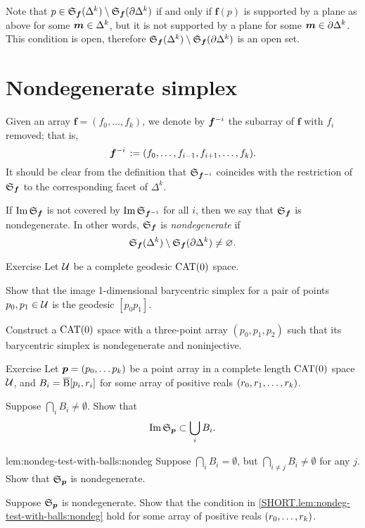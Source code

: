 Note that $p\in \mathfrak{S}_{\bm{f}}(\Delta^k)\setminus\mathfrak{S}_{\bm{f}}(\partial\Delta^k)$ if and only if 
$\bm{f}(p)$ is supported by a plane as above for some $\bm{m}\in\Delta^{k}$,
but it is not supported by a plane for some $\bm{m}\in\partial\Delta^{k}$.
This condition is open, therefore $\mathfrak{S}_{\bm{f}}(\Delta^k)\setminus\mathfrak{S}_{\bm{f}}(\partial\Delta^k)$ is an open set.
\qeds

\section{Nondegenerate simplex}

Given an array $\bm{f}=(f_0,\dots,f_k)$,
we denote by $\bm{f}^{{-} i}$ the subarray of $\bm{f}$ with $f_i$ removed;
that is, 
\[\bm{f}^{{-} i\,}
\mathrel{:=}
(f_0,\dots,f_{i-1},f_{i+1},\dots,f_k).\]
It should be clear from the definition that $\mathfrak{S}_{\bm{f}^{{-} i}}$ 
coincides with the restriction of $\mathfrak{S}_{\bm{f}}$ to the corresponding facet of $\Delta^k$.

If $\operatorname{\rm Im}\nolimits \mathfrak{S}_{\bm{f}}$ is not covered by $\operatorname{\rm Im}\nolimits \mathfrak{S}_{\bm{f}^{{-} i}}$ for all $i$,
then we say that $\mathfrak{S}_{\bm{f}}$ is nondegenerate.
In other words, $\mathfrak{S}_{\bm{f}}$ is \emph{nondegenerate} if 
\[\mathfrak{S}_{\bm{f}}(\Delta^k)\setminus \mathfrak{S}_{\bm{f}}(\partial \Delta^k)\ne\varnothing.\]

\begin{thm}{Exercise}\label{ex:barysimple}
Let $\mathcal{U}$ be a complete geodesic $\mathrm{CAT}(0)$ space.

Show that the image 1-dimensional barycentric simplex for a pair of points $p_0,p_1\in\mathcal{U}$ is the geodesic $[p_0p_1]$.

Construct a $\mathrm{CAT}(0)$ space with a three-point array $(p_0,p_1,p_2)$ such that its barycentric simplex is nondegenerate and noninjective. 
\end{thm}


\begin{thm}{Exercise}\label{lem:nondeg-test-with-balls}
Let $\bm{p}\z=(p_0,\dots p_\kay)$ be a point array 
in a complete length $\mathrm{CAT}(0)$ space $\mathcal{U}$, 
and $B_i=\overline{\mathrm{B}}{}[p_i,r_i]$ for some array of positive reals $(r_0,r_1,\dots,r_k)$.

\begin{subthm}{}
Suppose $\bigcap_i B_i\ne \emptyset$. Show that 
\[\operatorname{\rm Im}\nolimits\mathfrak{S}_{\bm{p}}\subset \bigcup_i B_i.\]
\end{subthm}

\begin{subthm}{lem:nondeg-test-with-balls:nondeg}
Suppose $\bigcap_i B_i= \emptyset$, but $\bigcap_{i\ne j} B_i\ne \emptyset$ for any $j$.
Show that 
$\mathfrak{S}_{\bm{p}}$ is nondegenerate.
\end{subthm}

\begin{subthm}{}
Suppose $\mathfrak{S}_{\bm{p}}$ is nondegenerate.
Show that the condition in \ref{SHORT.lem:nondeg-test-with-balls:nondeg} hold for some 
  array of positive reals $(r_0,\dots,r_k)$.
\end{subthm}

\end{thm}



